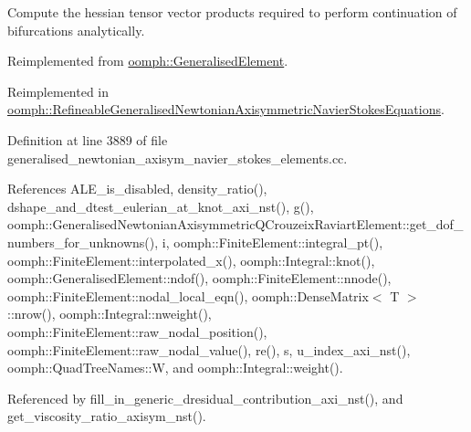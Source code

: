 Compute the hessian tensor vector products required to perform continuation of bifurcations analytically. 



Reimplemented from \hyperlink{classoomph_1_1GeneralisedElement_a94e118d65f31ce404963509e462b2d0e}{oomph\+::\+Generalised\+Element}.



Reimplemented in \hyperlink{classoomph_1_1RefineableGeneralisedNewtonianAxisymmetricNavierStokesEquations_a7794ad4a3ea19be7604d7c8884debe70}{oomph\+::\+Refineable\+Generalised\+Newtonian\+Axisymmetric\+Navier\+Stokes\+Equations}.



Definition at line 3889 of file generalised\+\_\+newtonian\+\_\+axisym\+\_\+navier\+\_\+stokes\+\_\+elements.\+cc.



References A\+L\+E\+\_\+is\+\_\+disabled, density\+\_\+ratio(), dshape\+\_\+and\+\_\+dtest\+\_\+eulerian\+\_\+at\+\_\+knot\+\_\+axi\+\_\+nst(), g(), oomph\+::\+Generalised\+Newtonian\+Axisymmetric\+Q\+Crouzeix\+Raviart\+Element\+::get\+\_\+dof\+\_\+numbers\+\_\+for\+\_\+unknowns(), i, oomph\+::\+Finite\+Element\+::integral\+\_\+pt(), oomph\+::\+Finite\+Element\+::interpolated\+\_\+x(), oomph\+::\+Integral\+::knot(), oomph\+::\+Generalised\+Element\+::ndof(), oomph\+::\+Finite\+Element\+::nnode(), oomph\+::\+Finite\+Element\+::nodal\+\_\+local\+\_\+eqn(), oomph\+::\+Dense\+Matrix$<$ T $>$\+::nrow(), oomph\+::\+Integral\+::nweight(), oomph\+::\+Finite\+Element\+::raw\+\_\+nodal\+\_\+position(), oomph\+::\+Finite\+Element\+::raw\+\_\+nodal\+\_\+value(), re(), s, u\+\_\+index\+\_\+axi\+\_\+nst(), oomph\+::\+Quad\+Tree\+Names\+::W, and oomph\+::\+Integral\+::weight().



Referenced by fill\+\_\+in\+\_\+generic\+\_\+dresidual\+\_\+contribution\+\_\+axi\+\_\+nst(), and get\+\_\+viscosity\+\_\+ratio\+\_\+axisym\+\_\+nst().

\mbox{\label{classoomph_1_1GeneralisedNewtonianAxisymmetricNavierStokesEquations_a95e10086130b3745e915b20c0c3e028a}} 
